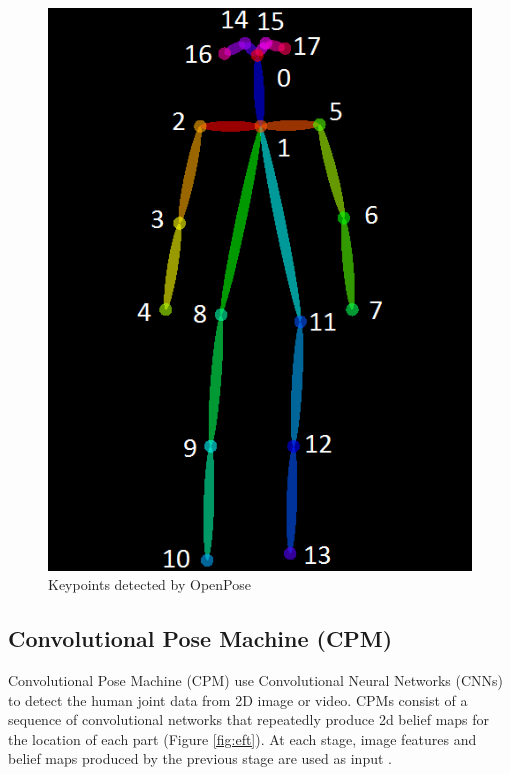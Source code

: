 \begin{figure}[htbp]
\centering\includegraphics[scale=0.55]{./img/keypoints_openpose.png}
  \caption[Keypoints detected by OpenPose]{Keypoints detected by OpenPose \cite{cao2017realtime}}\label{fig:Keypoints detected by OpenPose}
\end{figure}

\subsection*{Convolutional Pose Machine (CPM)}
 \par Convolutional Pose Machine (CPM) use Convolutional Neural Networks (CNNs) to detect the human joint data from 2D image or video. CPMs consist of a sequence of convolutional networks that repeatedly produce 2d belief maps for the location of each part (Figure \ref{fig:eft}). At each stage, image features and belief maps produced by the previous stage are used as input \cite{Wei2016}.

